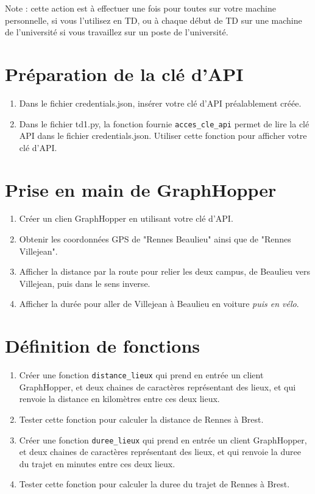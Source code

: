 \documentclass[11pt,a4paper]{article}
\begin{document}
Note : cette action est à effectuer une fois pour toutes sur votre machine personnelle, si vous l’utilisez en TD, ou à chaque début de TD sur une machine de l’université si vous travaillez sur un poste de l’université.

\section{Préparation de la clé d'API}
\begin{enumerate}
    \item Dans le fichier credentials.json, insérer votre clé d'API préalablement créée.
    \item Dans le fichier td1.py, la fonction fournie \verb+acces_cle_api+ permet de lire la clé API dans le fichier credentials.json. 
    Utiliser cette fonction pour afficher votre clé d'API.
\end{enumerate}
        
\section{Prise en main de GraphHopper}
\begin{enumerate}
    \item Créer un clien GraphHopper en utilisant votre clé d'API.
    \item Obtenir les coordonnées GPS de "Rennes Beaulieu" ainsi que de "Rennes Villejean".
    \item Afficher la distance par la route pour relier les deux campus, de Beaulieu vers Villejean, puis dans le sens inverse.
    \item Afficher la durée pour aller de Villejean à Beaulieu en voiture \emph{puis en vélo}. %
\end{enumerate}

\section{Définition de fonctions}
\begin{enumerate}
    \item Créer une fonction \verb+distance_lieux+ qui prend en entrée un client GraphHopper, et deux chaines de caractères représentant des lieux, et qui renvoie la distance en kilomètres entre ces deux lieux.
    \item Tester cette fonction pour calculer la distance de Rennes à Brest.
    \item Créer une fonction \verb+duree_lieux+ qui prend en entrée un client GraphHopper, et deux chaines de caractères représentant des lieux, et qui renvoie la duree du trajet en minutes entre ces deux lieux.
    \item Tester cette fonction pour calculer la duree du trajet de Rennes à Brest.
\end{enumerate}
\end{document}
